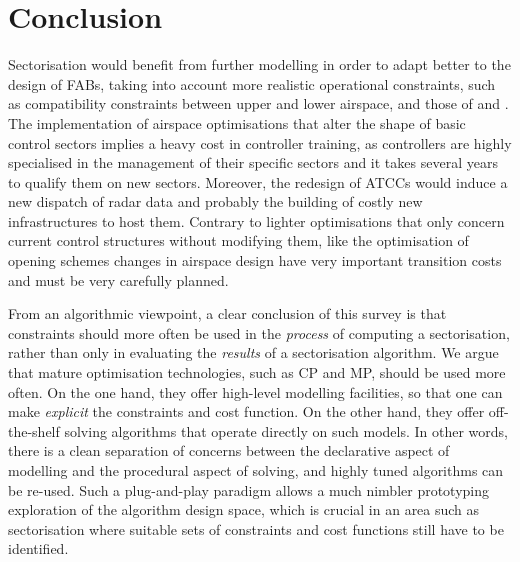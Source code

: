 \documentclass[a4paper,12pt]{article}
\begin{document}
\section{Conclusion}
\label{sect:concl}

Sectorisation would benefit from further modelling in order to adapt
better to the design of FABs, taking into account more realistic
operational constraints, such as compatibility constraints between
upper and lower airspace, and those of \cite{Sabhnani:ATIO10} and
\cite{Xue:GNC10}.  The implementation of airspace optimisations that
alter the shape of basic control sectors implies a heavy cost in
controller training, as controllers are highly specialised in the
management of their specific sectors and it takes several years to
qualify them on new sectors.  Moreover, the redesign of ATCCs would
induce a new dispatch of radar data and probably the building of
costly new infrastructures to host them.  Contrary to lighter
optimisations that only concern current control structures without
modifying them, like the optimisation of opening schemes changes in
airspace design have very important transition costs and must be very
carefully planned.

From an algorithmic viewpoint, a clear conclusion of this survey is
that constraints should more often be used in the \emph{process} of
computing a sectorisation, rather than only in evaluating the
\emph{results} of a sectorisation algorithm.  We argue that mature
optimisation technologies, such as CP and MP, should be used more
often.  On the one hand, they offer high-level modelling facilities,
so that one can make \emph{explicit} the constraints and cost
function.  On the other hand, they offer off-the-shelf solving
algorithms that operate directly on such models.  In other words,
there is a clean separation of concerns between the declarative aspect
of modelling and the procedural aspect of solving, and highly tuned
algorithms can be re-used.  Such a plug-and-play paradigm allows a
much nimbler prototyping exploration of the algorithm design space,
which is crucial in an area such as sectorisation where suitable sets
of constraints and cost functions still have to be identified.



\end{document}
